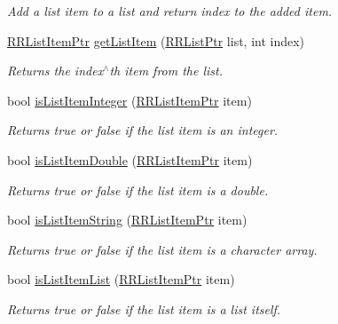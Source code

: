\begin{DoxyCompactItemize}
\begin{DoxyCompactList}\small\item\em Add a list item to a list and return index to the added item. \end{DoxyCompactList}\item 
\hyperlink{rrc__types_8h_a79938364b69256c42480bb3a29ebf73e}{R\+R\+List\+Item\+Ptr} \hyperlink{group__list_gaf1f33d11323825ab94f9318ba8b55de2}{get\+List\+Item} (\hyperlink{rrc__types_8h_a32a8a60ac06858ff3a791672bd2bec73}{R\+R\+List\+Ptr} list, int index)
\begin{DoxyCompactList}\small\item\em Returns the index$^\wedge$th item from the list. \end{DoxyCompactList}\item 
bool \hyperlink{group__list_gab2569fd6833d5fee7e30efd3a41543e3}{is\+List\+Item\+Integer} (\hyperlink{rrc__types_8h_a79938364b69256c42480bb3a29ebf73e}{R\+R\+List\+Item\+Ptr} item)
\begin{DoxyCompactList}\small\item\em Returns true or false if the list item is an integer. \end{DoxyCompactList}\item 
bool \hyperlink{group__list_ga2c763671f6abbbe6b467dc6fd38cbb27}{is\+List\+Item\+Double} (\hyperlink{rrc__types_8h_a79938364b69256c42480bb3a29ebf73e}{R\+R\+List\+Item\+Ptr} item)
\begin{DoxyCompactList}\small\item\em Returns true or false if the list item is a double. \end{DoxyCompactList}\item 
bool \hyperlink{group__list_gaeffbde1640953b8ab54725edb9db5474}{is\+List\+Item\+String} (\hyperlink{rrc__types_8h_a79938364b69256c42480bb3a29ebf73e}{R\+R\+List\+Item\+Ptr} item)
\begin{DoxyCompactList}\small\item\em Returns true or false if the list item is a character array. \end{DoxyCompactList}\item 
bool \hyperlink{group__list_ga7adc281139a5571239beaf3fb4b42b47}{is\+List\+Item\+List} (\hyperlink{rrc__types_8h_a79938364b69256c42480bb3a29ebf73e}{R\+R\+List\+Item\+Ptr} item)
\begin{DoxyCompactList}\small\item\em Returns true or false if the list item is a list itself. \end{DoxyCompactList}\item 

\end{DoxyCompactItemize}
